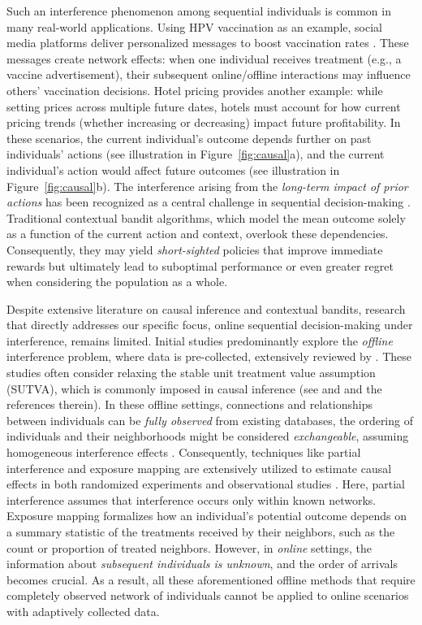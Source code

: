 \documentclass[12pt]{article}
\begin{document}
Such an interference phenomenon among sequential individuals is common in many real-world applications. Using HPV vaccination as an example, social media platforms deliver personalized messages to boost vaccination rates \citep{hopfer2022,athey2023}. These messages create network effects: when one individual receives treatment (e.g., a vaccine advertisement), their subsequent online/offline interactions may influence others' vaccination decisions. Hotel pricing \citep[see e.g.,][]{cho2018} provides another example: while setting prices across multiple future dates, hotels must account for how current pricing trends (whether increasing or decreasing) impact future profitability. In these scenarios, the current individual's outcome depends further on past individuals' actions (see illustration in Figure~\ref{fig:causal}a), and the current individual's action would affect future outcomes (see illustration in Figure~\ref{fig:causal}b). 
The interference arising from the \textit{long-term impact of prior actions} has been recognized as a central challenge in sequential decision-making \citep[see e.g.,][]{agarwal2024,xu2024}. Traditional contextual bandit algorithms, which model the mean outcome solely as a function of the current action and context, overlook these dependencies. Consequently, they may yield \textit{short-sighted} policies that improve immediate rewards but ultimately lead to suboptimal performance or even greater regret when considering the population as a whole.

Despite extensive literature on causal inference and contextual bandits, research that directly addresses our specific focus, online sequential decision-making under interference, remains limited. Initial studies predominantly explore the \textit{offline} interference problem, where data is pre-collected, extensively reviewed by \cite{bajari2023}. These studies often consider relaxing the stable unit treatment value assumption (SUTVA), which is commonly imposed in causal inference (see \cite{rosenbaum2007} and \cite{forastiere2021} and the references therein). In these offline settings, connections and relationships between individuals can be \textit{fully observed} from existing databases, the ordering of individuals and their neighborhoods might be considered \textit{exchangeable}, assuming homogeneous interference effects \citep[see e.g.,][]{forastiere2021,qu2021,bargagli2025}. Consequently, techniques like partial interference and exposure mapping are extensively utilized to estimate causal effects in both randomized experiments \citep{sobel2006,hudgens2008,aronow2012,liu2014,aronow2017} and observational studies \citep{manski2013,forastiere2021,qu2021,lee2024,bargagli2025}. Here, partial interference assumes that interference occurs only within known networks. Exposure mapping formalizes how an individual’s potential outcome depends on a summary statistic of the treatments received by their neighbors, such as the count or proportion of treated neighbors. However, in \textit{online} settings, the information about \textit{subsequent individuals is unknown}, and the order of arrivals becomes crucial. As a result, all these aforementioned offline methods that require completely observed network of individuals cannot be applied to online scenarios with adaptively collected data. 
\end{document}
